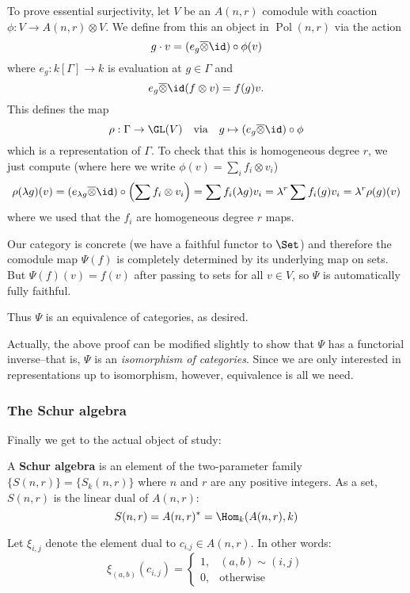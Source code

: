 \documentclass[12pt]{article}
\DeclareMathOperator{\Pol}{Pol}
\begin{document}
\begin{prf}
	To prove essential surjectivity, let $V$ be an $A(n,r)$ comodule with coaction $\phi:V\to A(n,r)\otimes V$.
	We define from this an object in $\Pol(n,r)$ via the action 
	\[g\cdot v=(e_g\overline\otimes \id)\circ\phi(v)\]
	where $e_g:k[\Gamma]\to k$ is evaluation at $g\in \Gamma$ and 
	\[e_g\overline\otimes\id (f\otimes v)=f(g)v.\]
	This defines the map 
	\[\rho:\Gamma\to \GL(V)\quad\text{via}\quad g\mapsto (e_g\overline\otimes \id)\circ\phi\]
	which is a representation of $\Gamma$. To check that this is homogeneous degree $r$, we just compute (where here we write $\phi(v)=\sum_i f_i\otimes v_i$)
	\[\rho(\lambda g)(v)=(e_{\lambda g}\overline\otimes\id)\circ\left(\sum f_i\otimes v_i\right)=\sum f_i(\lambda g)v_i=\lambda^r\sum f_i(g)v_i=\lambda^r\rho(g)(v)\]
	where we used that the $f_i$ are homogeneous degree $r$ maps.

	Our category is concrete (we have a faithful functor to $\Set$) and therefore the comodule map $\Psi(f)$
	is completely determined by its underlying map on sets. But $\Psi(f)(v)=f(v)$ after passing to sets for all $v\in V$,
	so $\Psi$ is automatically fully faithful. 

	Thus $\Psi$ is an equivalence of categories, as desired.
\end{prf}
\begin{rmk}
	Actually, the above proof can be modified slightly to show that $\Psi$ has a functorial inverse--that is, $\Psi$ is an \textit{isomorphism of categories}.
	Since we are only interested in representations up to isomorphism, however, equivalence is all we need.
\end{rmk}

\subsubsection{The Schur algebra}
Finally we get to the actual object of study:
\begin{defn}\label{def:schur-alg}
	A \textbf{Schur algebra} is an element of the two-parameter family $\{S(n,r)\}=\{S_k(n,r)\}$ where $n$ and $r$ are any positive integers.
	As a set, $S(n,r)$ is the linear dual of $A(n,r)$:
	\[S(n,r)=A(n,r)^\ast=\Hom_k(A(n,r),k)\] 

	Let $\xi_{i,j}$ denote the element dual to $c_{i.j}\in A(n,r)$. In other words:
	\[\xi_{(a,b)}(c_{i,j})=\begin{cases}
		1, & (a,b)\sim(i,j)\\
		0, & \text{otherwise}
	\end{cases}\]
\end{defn}
\end{document}
